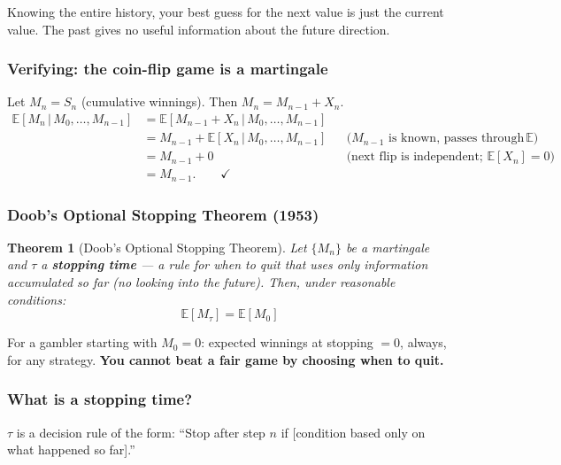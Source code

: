 \documentclass[12pt, a4paper]{article}
\newtheorem{theorem}{Theorem}
\newcommand{\E}{\mathbb{E}}            %
\newcommand{\given}{\,\vert\,}         %
\begin{document}
\begin{plainlanguage}
Knowing the entire history, your best guess for the next value is just the
current value.  The past gives no useful information about the future direction.
\end{plainlanguage}

\subsubsection*{Verifying: the coin-flip game is a martingale}

Let $M_n = S_n$ (cumulative winnings).  Then $M_n = M_{n-1} + X_n$.
\begin{align*}
  \E[M_n \given M_0,\ldots,M_{n-1}]
  &= \E[M_{n-1} + X_n \given M_0,\ldots,M_{n-1}] \\
  &= M_{n-1} + \E[X_n \given M_0,\ldots,M_{n-1}]
     & &\text{($M_{n-1}$ is known, passes through $\E$)} \\
  &= M_{n-1} + 0
     & &\text{(next flip is independent; $\E[X_n]=0$)} \\
  &= M_{n-1}. \qquad\checkmark
\end{align*}

\subsubsection*{Doob's Optional Stopping Theorem (1953)}

\begin{theorem}[Doob's Optional Stopping Theorem]
Let $\{M_n\}$ be a martingale and $\tau$ a \textbf{stopping time} --- a rule
for when to quit that uses only information accumulated so far (no looking into
the future).  Then, under reasonable conditions:
\[
  \boxed{\E[M_\tau] = \E[M_0]}
\]
\end{theorem}

\begin{plainlanguage}
For a gambler starting with $M_0 = 0$: expected winnings at stopping $= 0$,
always, for any strategy.  \textbf{You cannot beat a fair game by choosing
when to quit.}
\end{plainlanguage}

\subsubsection*{What is a stopping time?}

$\tau$ is a decision rule of the form: ``Stop after step $n$ if [condition
based only on what happened so far].''
\end{document}
